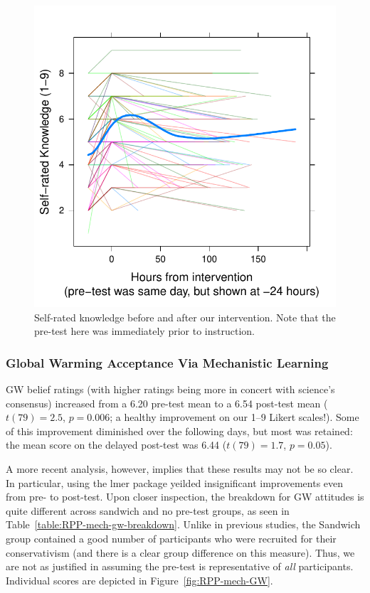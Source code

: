 \begin{figure}
    \centering
    \includegraphics{RPP-mech-self.pdf}
    \caption{Self-rated knowledge before and after our intervention. Note that the
        pre-test here was immediately prior to instruction.}
    \label{fig:RPP-mech-self}
\end{figure}

\subsubsection{Global Warming Acceptance Via Mechanistic Learning}

GW belief ratings (with higher ratings being more in concert with science’s
consensus) increased from a 6.20 pre-test mean to a 6.54 post-test mean
($t(79)=2.5$, $p=0.006$; a healthy improvement on our 1--9 Likert scales!). Some
of this improvement diminished over the following days, but most was retained:
the mean score on the delayed post-test was 6.44 ($t(79)=1.7$, $p=0.05$). 

A more recent analysis, however, implies that these results may not be so clear.
In particular, using the \textsf{lmer} package yeilded insignificant
improvements even from pre- to post-test. Upon closer inspection, the breakdown
for GW attitudes is quite different across sandwich and no pre-test groups, as
seen in Table~\ref{table:RPP-mech-gw-breakdown}. Unlike in previous studies,
the Sandwich group contained a good number of participants who were recruited
for their conservativism (and there is a clear group difference on this
measure). Thus, we are not as justified in assuming the pre-test is
representative of \emph{all} participants. Individual scores are depicted in
Figure~\ref{fig:RPP-mech-GW}.

